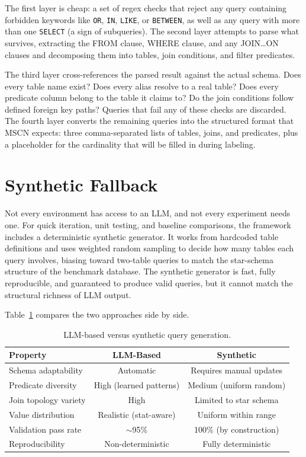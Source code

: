 The first layer is cheap: a set of regex checks that reject any query containing forbidden keywords like \texttt{OR}, \texttt{IN}, \texttt{LIKE}, or \texttt{BETWEEN}, as well as any query with more than one \texttt{SELECT} (a sign of subqueries). The second layer attempts to parse what survives, extracting the FROM clause, WHERE clause, and any JOIN\ldots ON clauses and decomposing them into tables, join conditions, and filter predicates.

The third layer cross-references the parsed result against the actual schema. Does every table name exist? Does every alias resolve to a real table? Does every predicate column belong to the table it claims to? Do the join conditions follow defined foreign key paths? Queries that fail any of these checks are discarded. The fourth layer converts the remaining queries into the structured format that MSCN expects: three comma-separated lists of tables, joins, and predicates, plus a placeholder for the cardinality that will be filled in during labeling.


\section{Synthetic Fallback}

Not every environment has access to an LLM, and not every experiment needs one. For quick iteration, unit testing, and baseline comparisons, the framework includes a deterministic synthetic generator. It works from hardcoded table definitions and uses weighted random sampling to decide how many tables each query involves, biasing toward two-table queries to match the star-schema structure of the benchmark database. The synthetic generator is fast, fully reproducible, and guaranteed to produce valid queries, but it cannot match the structural richness of LLM output.

Table~\ref{tab:gen_comparison} compares the two approaches side by side.

\begin{table}[htbp]
\centering
\caption{LLM-based versus synthetic query generation.}
\label{tab:gen_comparison}
\begin{tabular}{|l|c|c|}
\hline
\textbf{Property} & \textbf{LLM-Based} & \textbf{Synthetic} \\
\hline
Schema adaptability & Automatic & Requires manual updates \\
Predicate diversity & High (learned patterns) & Medium (uniform random) \\
Join topology variety & High & Limited to star schema \\
Value distribution & Realistic (stat-aware) & Uniform within range \\
Validation pass rate & $\sim$95\% & 100\% (by construction) \\
Reproducibility & Non-deterministic & Fully deterministic \\
\hline
\end{tabular}
\end{table}
